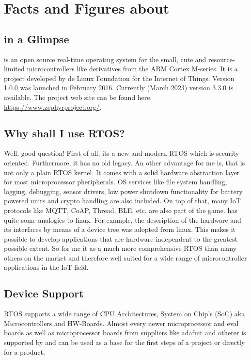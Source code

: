 \chapter{Facts and Figures about \Zephyr}

\section{\Zephyr in a Glimpse}
\Zephyr is an open source real-time operating system for the small, cute and resource-limited microcontrollers like derivatives from the ARM Cortex M-series. It is a project developed by de Linux Foundation for the Internet of Things. 
Version 1.0.0 was launched in February 2016. Currently (March 2023) version 3.3.0 is available.
The project web site can be found here: \url{https://www.zephyrproject.org/}.

\section{Why shall I use \Zephyr RTOS?}
Well, good question! First of all, its a new and modern RTOS which is security oriented. Furthermore, it has no old legacy. An other advantage for me is, that \Zephyr is not only a plain RTOS kernel. It comes with a solid hardware abstraction layer for most microprocessor pheripherals. OS services like file system handling, logging, debugging, sensor drivers, low power shutdown functionality for battery powered units and crypto handling are also included. On top of that, many IoT protocols like MQTT, CoAP, Thread, BLE, etc. are also part of the game. 
\Zephyr has quite some analogies to linux. For example, the description of the hardware and its interfaces by means of a device tree was adopted from linux. 
This makes it possible to develop applications that are hardware independent to the greatest possible extent. 
So for me it as a much more comprehensive RTOS than many others on the market and therefore well suited for a wide range of microcontroller applications in the IoT field. 

\section{Device Support}

\Zephyr RTOS supports a wide range of CPU Architectures, System on Chip's (SoC) aka Microcontrollers  and HW-Boards. Almost every newer microprocessor and eval boards as well as microprocessor boards from suppliers like adafuit and otherer is supported by \Zephyr and can be used as a base for the first steps of a project or directly for a product. 

